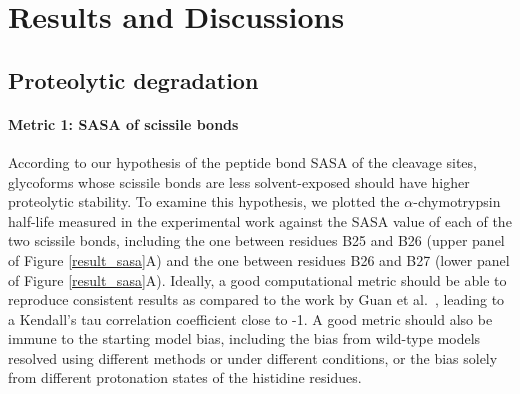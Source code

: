 \documentclass[9pt]{elife}
\providecommand{\DIFdelend}{} %
\begin{document}
\DIFdelend %
\section{Results and Discussions}\label{results}
\subsection{Proteolytic degradation}
\paragraph{Metric 1: SASA of scissile bonds}
According to our hypothesis of the peptide bond SASA of the cleavage sites, glycoforms whose scissile bonds are less solvent-exposed should have higher proteolytic stability. To examine this hypothesis, we plotted the $\alpha$-chymotrypsin half-life measured in the experimental work against the SASA value of each of the two scissile bonds, including the one between residues B25 and B26 (upper panel of Figure \ref{result_sasa}A) and the one between residues B26 and B27 (lower panel of Figure \ref{result_sasa}A). Ideally, a good computational metric should be able to reproduce consistent results as compared to the work by Guan et al.~\cite{guan2018chemically}, leading to a Kendall's tau correlation coefficient close to -1. A good metric should also be immune to the starting model bias, including the bias from wild-type models resolved using different methods or under different conditions, or the bias solely from different protonation states of the histidine residues. 
\end{document}
